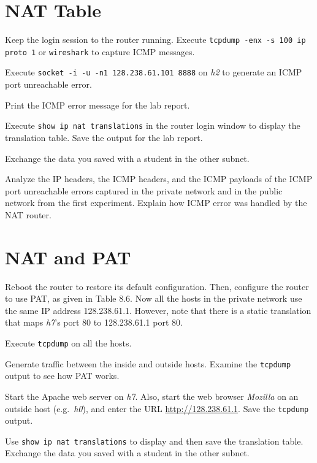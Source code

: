 \documentclass{../UTNetLab}
\begin{document}
\section{NAT Table}
    Keep the login session to the router running. Execute \lstinline{tcpdump -enx -s 100 ip proto 1} or \lstinline{wireshark} to capture ICMP messages. 

    Execute \lstinline{socket -i -u -n1 128.238.61.101 8888} on \textit{h2} to generate an ICMP port unreachable error. 

    Print the ICMP error message for the lab report. 

    Execute \lstinline[language=cisco]{show ip nat translations} in the router login window to display the translation table.
    Save the output for the lab report.

    Exchange the data you saved with a student in the other subnet.
    
    \begin{report}
    \item Analyze the IP headers, the ICMP headers, and the ICMP payloads of the ICMP port unreachable errors captured in the private network and in the public network from the first experiment.
    Explain how ICMP error was handled by the NAT router.
    \end{report}

\section{NAT and PAT}
    Reboot the router to restore its default configuration.
    Then, configure the router to use PAT, as given in Table 8.6. Now all the hosts in the private network use the same IP address 128.238.61.1. However, note that there is a static translation that maps \textit{h7}’s port 80 to 128.238.61.1 port 80. 

    Execute \lstinline{tcpdump} on all the hosts. 

    Generate traffic between the inside and outside hosts.
    Examine the \lstinline{tcpdump} output to see how PAT works.

    Start the Apache web server on \textit{h7}. Also, start the web browser \textit{Mozilla} on an outside host (e.g.\ \textit{h0}), and enter the URL \url{http://128.238.61.1}. Save the \lstinline{tcpdump} output.

    Use \lstinline{show ip nat translations} to display and then save the translation table.
    Exchange the data you saved with a student in the other subnet.
\end{document}
